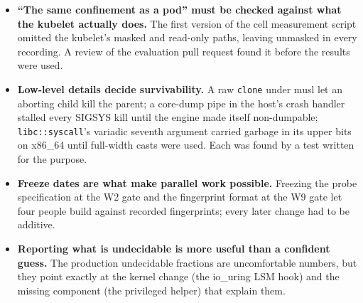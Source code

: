 \begin{itemize}[leftmargin=*]
\item \textbf{``The same confinement as a pod'' must be checked against what the kubelet actually does.} The first version of the cell measurement script omitted the kubelet's masked and read-only paths, leaving  unmasked in every recording. A review of the evaluation pull request found it before the results were used.
\item \textbf{Low-level details decide survivability.} A raw \texttt{clone} under musl let an aborting child kill the parent; a core-dump pipe in the host's crash handler stalled every SIGSYS kill until the engine made itself non-dumpable; \texttt{libc::syscall}'s variadic seventh argument carried garbage in its upper bits on x86\_64 until full-width casts were used. Each was found by a test written for the purpose.
\item \textbf{Freeze dates are what make parallel work possible.} Freezing the probe specification at the W2 gate and the fingerprint format at the W9 gate let four people build against recorded fingerprints; every later change had to be additive.
\item \textbf{Reporting what is undecidable is more useful than a confident guess.} The production undecidable fractions are uncomfortable numbers, but they point exactly at the kernel change (the io\_uring LSM hook) and the missing component (the privileged helper) that explain them.
\end{itemize}
